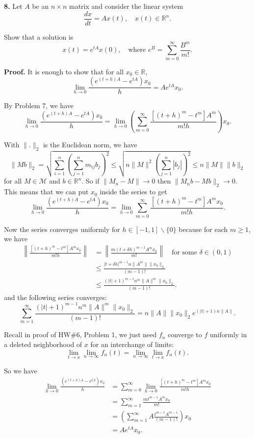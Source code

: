 \documentclass{article}
\begin{document}
    \textbf{8.} Let $A$ be an $n \times n$ matrix and consider the linear
system \[\frac{dx}{dt}= Ax(t),\quad x(t) \in \mathbb{R}^n.\]

Show that a solution is
\[x(t) = e^{tA} x(0),\quad \text{where }e^B =\sum_{m=0}^{\infty}\frac{B^m}{m!}.\]

    \textbf{Proof.} It is enough to show that for all $x_0 \in \mathbb{R}$,
\[\tag{*}\lim_{h\to 0} \frac{(e^{(t+h)A}-e^{tA})x_0}{h} = Ae^{tA}x_0.\]

By Problem 7, we have
\[\lim_{h\to 0} \frac{(e^{(t+h)A}-e^{tA})x_0}{h} = \lim_{h\to 0} \left(\sum_{m=0}^{\infty}\frac{[(t+h)^m-t^m]A^m}{m!h}\right)x_0.\]

With $\|.\|_2$ is the Euclidean norm, we have
\[\|Mb\|_2 = \sqrt{\sum_{i=1}^n \left(\sum_{j=1}^n m_{ij}b_j\right)^2} \le \sqrt{ n\|M\|^2 \left(\sum_{j=1}^n |b_j|\right)^2} \le n \|M\| \|b\|_2\]
for all $M \in \mathcal{M}$ and $b\in \mathbb{R}^n$. So if
$\|M_n - M\| \to 0$ then $\|M_nb - Mb\|_2 \to 0$. This means that we can
put $x_0$ inside the series to get
\[\lim_{h\to 0} \frac{(e^{(t+h)A}-e^{tA})x_0}{h} = \lim_{h\to 0} \sum_{m=0}^{\infty}\frac{[(t+h)^m-t^m]A^mx_0}{m!h}.\]

Now the series converges uniformly for $h\in [-1,1]\backslash \{0\}$
because for each $m\ge 1$, we have
\[\begin{aligned}\left\|\frac{[(t+h)^m-t^m]A^mx_0}{m!h}\right\| &= \left\|\frac{m(t+\delta h)^{m-1}A^mx_0}{m!}\right\| \quad\text{for some }\delta \in (0,1) \\
&\le\frac{ |t + \delta h|^{m-1}n\|A^m\| \|x_0\|_2}{(m-1)!} \\
&\le \frac{(|t|+1)^{m-1}n^m\|A\|^m \|x_0\|_2}{(m-1)!}.
\end{aligned}\] and the following series converges:
\[\sum_{m=1}^{\infty}\frac{(|t|+1)^{m-1}n^m\|A\|^m \|x_0\|_2}{(m-1)!} = n\|A\|\|x_0\|_2 e^{(|t|+1)n\|A\|}.\]

Recall in proof of HW\#6, Problem 1, we just need $f_n$ converge to $f$
uniformly in a deleted neighborhood of $x$ for an interchange of limits:
\[ \lim_{t\to x}\lim_{n\to\infty} f_n(t) = \lim_{n\to \infty}\lim_{t\to x}f_n(t).\]

So we have \[\begin{aligned}
\lim_{h\to 0} \frac{(e^{(t+h)A}-e^{tA})x_0}{h} &=  \sum_{m=0}^{\infty}\lim_{h\to 0}\frac{[(t+h)^m-t^m]A^mx_0}{m!h}\\
& = \sum_{m=1}^{\infty} \frac{mt^{m-1}A^m x_0}{m!}\\
& = \left(\sum_{m=1}^{\infty} A\frac{t^{m-1}A^{m-1}}{(m-1)!}\right)x_0\\
& = A e^{tA}x_0.
\end{aligned}\]
\end{document}
